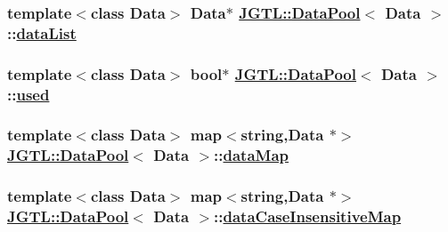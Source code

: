 \hypertarget{class_j_g_t_l_1_1_data_pool_483eef3daa9591762461688b095698e9}{
\subsubsection[dataList]{\setlength{\rightskip}{0pt plus 5cm}template$<$class Data$>$ Data$\ast$ \hyperlink{class_j_g_t_l_1_1_data_pool}{JGTL::Data\-Pool}$<$ Data $>$::\hyperlink{class_j_g_t_l_1_1_data_pool_483eef3daa9591762461688b095698e9}{data\-List}}}
\label{class_j_g_t_l_1_1_data_pool_483eef3daa9591762461688b095698e9}


\hypertarget{class_j_g_t_l_1_1_data_pool_c9f0500553ee7ffc10d526738c2691f2}{
\subsubsection[used]{\setlength{\rightskip}{0pt plus 5cm}template$<$class Data$>$ bool$\ast$ \hyperlink{class_j_g_t_l_1_1_data_pool}{JGTL::Data\-Pool}$<$ Data $>$::\hyperlink{class_j_g_t_l_1_1_data_pool_c9f0500553ee7ffc10d526738c2691f2}{used}}}
\label{class_j_g_t_l_1_1_data_pool_c9f0500553ee7ffc10d526738c2691f2}


\hypertarget{class_j_g_t_l_1_1_data_pool_1ae3a6d7344f663a81bd4b8f114943fa}{
\subsubsection[dataMap]{\setlength{\rightskip}{0pt plus 5cm}template$<$class Data$>$ map$<$string,Data $\ast$$>$ \hyperlink{class_j_g_t_l_1_1_data_pool}{JGTL::Data\-Pool}$<$ Data $>$::\hyperlink{class_j_g_t_l_1_1_data_pool_1ae3a6d7344f663a81bd4b8f114943fa}{data\-Map}}}
\label{class_j_g_t_l_1_1_data_pool_1ae3a6d7344f663a81bd4b8f114943fa}


\hypertarget{class_j_g_t_l_1_1_data_pool_e317f4950f8e4327198cd55bd49445d8}{
\subsubsection[dataCaseInsensitiveMap]{\setlength{\rightskip}{0pt plus 5cm}template$<$class Data$>$ map$<$string,Data $\ast$$>$ \hyperlink{class_j_g_t_l_1_1_data_pool}{JGTL::Data\-Pool}$<$ Data $>$::\hyperlink{class_j_g_t_l_1_1_data_pool_e317f4950f8e4327198cd55bd49445d8}{data\-Case\-Insensitive\-Map}}}
\label{class_j_g_t_l_1_1_data_pool_e317f4950f8e4327198cd55bd49445d8}


